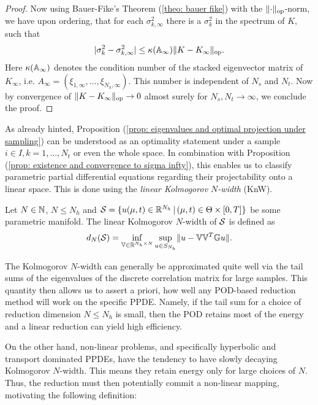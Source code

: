 \begin{proof}
    Now using Bauer-Fike's Theorem (\ref{theo: bauer fike}) with the $\lVert \cdot \rVert_\text{op}$-norm, we have upon ordering, 
    that for each $\sigma^2_{k, \infty}$ there is a $\sigma^2_{k}$ in the spectrum of $K$, such that
    \begin{equation*}
        \vert \sigma_k^2  - \sigma_{k, \infty}^2 \vert \leq \kappa(\mathbb{A}_\infty) \lVert K - K_\infty \rVert_\text{op}.
    \end{equation*}
    Here $\kappa(\mathbb{A}_\infty)$ denotes the condition number of the stacked eigenvector matrix of 
    $K_\infty$, i.e. $A_\infty = (\xi_{1, \infty}, \dots, \xi_{N_h, \infty})$. This number is independent of $N_s$ and $N_t$.
    Now by convergence of $\lVert K - K_\infty \rVert_\text{op} \to 0$ almost surely for $N_s, N_t \to \infty$, we conclude the proof. 
\end{proof}

As already hinted, Proposition (\ref{prop: eigenvalues and optimal projection under sampling}) 
can be understood as an optimality statement under a sample $i \in I, k = 1, \dots, N_t$ or even the whole space.
In combination with Proposition (\ref{prop: existence and convergence to sigma infty}), this
enables us to classify parametric partial differential equations regarding their projectability
onto a linear space. This is done using the \emph{linear Kolmogorov $N$-width} (KnW).

\begin{definition} \label{def: linear kolmogorov}
    Let $N \in \mathbb{N}$, $N \leq N_h$ and $\mathcal{S} = \{ u(\mu, t) \in \mathbb{R}^{N_h} \, 
    \vert \, (\mu, t) \in \Theta \times [0, T] \}$ 
    be some parametric manifold. The linear Kolmogorov $N$-width of $\mathcal{S}$ is defined as
    \begin{equation*}
        d_N(\mathcal{S}) = \inf\limits_{\mathbb{V} \in \mathbb{R}^{N_h \times N}} \sup\limits_{u \in S_{N_h}} 
        \lVert u - \mathbb{V} \mathbb{V}^T \mathbb{G} u \rVert.
    \end{equation*}
\end{definition}

The Kolmogorov $N$-width can generally be approximated quite well via the tail sums of
the eigenvalues of the discrete correlation matrix for large samples. 
This quantity then allows us to assert a priori,
how well any POD-based reduction method will work on the specific PPDE. Namely, if the tail sum for a choice of reduction 
dimension $N \leq N_h$ is small, then the POD retains most of the energy and a linear reduction can yield high efficiency.

On the other hand, non-linear problems, and specifically hyperbolic and transport dominated PPDEs, have
the tendency to have slowly decaying Kolmogorov $N$-width. This means they retain energy only for large choices of $N$.
Thus, the reduction must then potentially commit a non-linear mapping, motivating the following definition:

